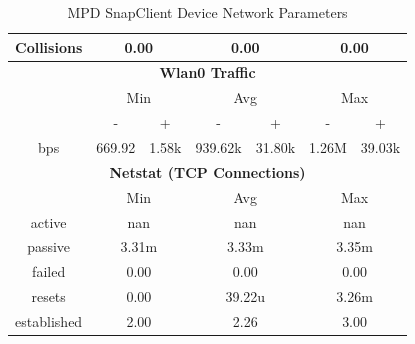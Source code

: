 \documentclass[11pt,a4paper,headinclude=false,footinclude=false]{scrreprt}
\begin{document}
\begin{table}[H]
\begin{tabular}{||c|c|c|c|c|c|c||}
    \hline
    Collisions & \multicolumn{2}{|c|}{0.00} & \multicolumn{2}{|c|}{0.00} & \multicolumn{2}{|c|}{0.00} \\
    \hline\hline
    \multicolumn{7}{|c|}{\textbf{Wlan0 Traffic}} \\
    \hline\hline
      & \multicolumn{2}{|c|}{Min} & \multicolumn{2}{|c|}{Avg} & \multicolumn{2}{|c|}{Max} \\
    \hline
      & - & + & - & + & - & + \\
    \hline
    bps  & 669.92 & 1.58k & 939.62k & 31.80k & 1.26M & 39.03k \\
    \hline\hline
    \multicolumn{7}{|c|}{\textbf{Netstat (TCP Connections)}} \\
    \hline\hline
      & \multicolumn{2}{|c|}{Min} & \multicolumn{2}{|c|}{Avg} & \multicolumn{2}{|c|}{Max} \\
    \hline
    active & \multicolumn{2}{|c|}{nan} & \multicolumn{2}{|c|}{nan} & \multicolumn{2}{|c|}{nan} \\
    \hline
    passive & \multicolumn{2}{|c|}{3.31m} & \multicolumn{2}{|c|}{3.33m} & \multicolumn{2}{|c|}{3.35m} \\
    \hline
    failed & \multicolumn{2}{|c|}{0.00} & \multicolumn{2}{|c|}{0.00} & \multicolumn{2}{|c|}{0.00} \\
    \hline
    resets & \multicolumn{2}{|c|}{0.00} & \multicolumn{2}{|c|}{39.22u} & \multicolumn{2}{|c|}{3.26m} \\
    \hline
    established & \multicolumn{2}{|c|}{2.00} & \multicolumn{2}{|c|}{2.26} & \multicolumn{2}{|c|}{3.00} \\
    \hline\hline
    \end{tabular}
    \caption{MPD SnapClient Device Network Parameters}
    \label{MPDclientNetTab}
\end{table}
\end{document}
